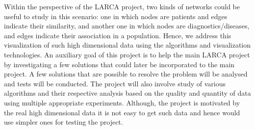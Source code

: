 \par Within the perspective of the LARCA project, two kinds of networks could be useful to study in this scenario: one in which nodes are patients and edges indicate their similarity, and another one in which nodes are diagnostics/diseases, and edges indicate their association in a population. Hence, we address this visualization of such high dimensional data using the algorithms and visualization technologies. 
An auxiliary goal of this project is to help the main LARCA project by investigating a few solutions that could later be incorporated to the main project. A few solutions that are possible to resolve the problem will be analysed and tests will be conducted. The project will also involve study of various algorithms and their respective analysis based on the quality and quantity of data using multiple appropriate experiments. Although, the project is motivated by the real high dimensional data it is not easy to get such data and hence would use simpler ones for testing the project.  



